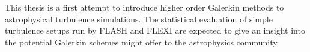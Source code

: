 This thesis is a first attempt to introduce higher order Galerkin methods to
astrophysical turbulence simulations. The statistical evaluation of simple
turbulence setups run by FLASH and FLEXI are expected to give an insight into
the potential Galerkin schemes might offer to the astrophysics community.

\newpage
